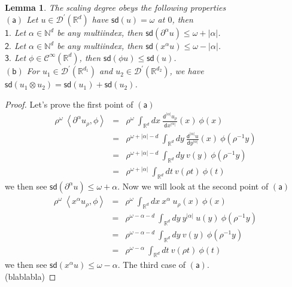 \documentclass[10pt]{book}
\newcommand{\sd}{\mathsf{sd}}
\newcommand{\abs}[1]{\left|#1\right|}
\newcommand{\sm}[1]{\left\langle#1\right\rangle}
\let\int\int
\newcommand{\Ccal}{\mathcal{C}}
\newcommand{\Dcal}{\mathcal{D}}
\newcommand{\Nbb}{\mathbb{N}}
\newcommand{\Rbb}{\mathbb{R}}
\newcommand{\dsf}{\mathsf{d}}
\theoremstyle{break}
\newtheorem{lemma}{Lemma}
\begin{document}
\begin{lemma}
 The scaling degree obeys the following properties \\
 $\mathsf{(a)}$ Let $u \in \Dcal^\prime(\Rbb^d)$ have $\sd(u) = \omega$ at $0$, then \\
 \hspace*{8mm} $\mathsf{1.}$ Let $\alpha \in \Nbb^d$ be any multiindex, then $\sd(\partial^\alpha u) \leq \omega + \abs{\alpha}$. \\
 \hspace*{8mm} $\mathsf{2.}$ Let $\alpha \in \Nbb^d$ be any multiindex, then $\sd(x^\alpha u) \leq \omega - \abs{\alpha}$. \\
 \hspace*{8mm} $\mathsf{3.}$ Let $\phi \in \Ccal^\infty(\Rbb^d)$, then $\sd(\phi u) \leq \sd(u)$. \\
 $\mathsf{(b)}$ For $u_1 \in \Dcal^\prime(\Rbb^{d_1})$ and $u_2 \in \Dcal^\prime(\Rbb^{d_2})$, we have $\sd(u_1\otimes u_2) = \sd(u_1) + \sd(u_2)$.
 
\end{lemma}

\begin{proof} 
 Let's prove the first point of $\mathsf{(a)}$
 \begin{eqnarray*}
  \rho^\omega \ \sm{\partial^{\alpha}u_\rho,\phi} &=& \rho^\omega \ \int_{\Rbb^d} dx \ \frac{\dsf^{\abs{\alpha}}u_\rho}{\dsf x^{\abs{\alpha}}}(x) \ \phi(x) \\
  &=& \rho^{\omega+\abs{\alpha}-d} \ \int_{\Rbb^d} dy \ \frac{\dsf^{\abs{\alpha}}u}{\dsf y^{\abs{\alpha}}}(x) \ \phi(\rho^{-1}y) \\
  &=& \rho^{\omega+\abs{\alpha}-d} \ \int_{\Rbb^d} dy \ v(y) \ \phi(\rho^{-1}y) \\
  &=& \rho^{\omega+\abs{\alpha}} \ \int_{\Rbb^d} dt \ v(\rho t) \ \phi(t) 
 \end{eqnarray*}
 we then see $\sd(\partial^\alpha u) \leq \omega + \alpha$. Now we will look at the second point of $\mathsf{(a)}$
 \begin{eqnarray*}
  \rho^\omega \ \sm{x^{\alpha}u_\rho,\phi} &=& \rho^\omega \ \int_{\Rbb^d} dx \ x^{\alpha} \ u_\rho(x) \ \phi(x) \\
  &=& \rho^{\omega-\alpha-d} \ \int_{\Rbb^d} dy \ y^{\abs{\alpha}} \ u(y) \ \phi(\rho^{-1}y) \\
  &=& \rho^{\omega-\alpha-d} \ \int_{\Rbb^d} dy \ v(y) \ \phi(\rho^{-1}y) \\
  &=& \rho^{\omega-\alpha} \ \int_{\Rbb^d} dt \ v(\rho t) \ \phi(t)
 \end{eqnarray*}
 we then see $\sd(x^\alpha u) \leq \omega - \alpha$. The third case of $\mathsf{(a)}$. \\
 (blablabla)

\end{proof}
\end{document}
